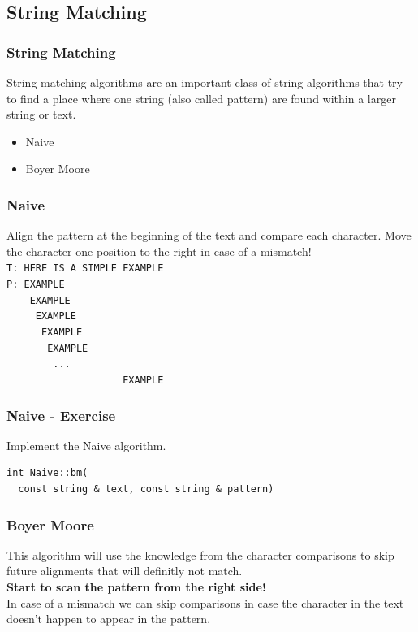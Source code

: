 \subsection{String Matching}

\begin{frame}[fragile] 
  \frametitle{String Matching}
  String matching algorithms are an important class of string algorithms that try
  to find a place where one string (also called pattern) are found within a larger
  string or text.
  \vspace{3mm}
  \begin{itemize}
  \item Naive
  \item Boyer Moore
  \end{itemize}
\end{frame}

\begin{frame}[fragile] 
  \frametitle{Naive}
  Align the pattern at the beginning of the text and compare each character.
  Move the character one position to the right in case of a mismatch!\\
  \vspace{3mm}
  {\small
  \verb|T: HERE IS A SIMPLE EXAMPLE|\\
  \verb|P: EXAMPLE|\\
  \verb|    EXAMPLE|\\
  \verb|     EXAMPLE|\\
  \verb|      EXAMPLE|\\
  \verb|       EXAMPLE|\\
  \verb|        ...|\\
  \verb|                    EXAMPLE|\\
  }
\end{frame}

\begin{frame}[fragile] 
\frametitle{Naive - Exercise}
\begin{exercise}
Implement the Naive algorithm.
\begin{lstlisting}
int Naive::bm(
  const string & text, const string & pattern)
\end{lstlisting}
\end{exercise}
\end{frame}

\begin{frame}[fragile] 
  \frametitle{Boyer Moore}
  This algorithm will use the knowledge from the character comparisons to skip
  future alignments that will definitly not match.\\
  {\bf Start to scan the pattern from the right side!}\\
  In case of a mismatch we can skip comparisons in case the character in the text
  doesn’t happen to appear in the pattern.
\end{frame}

